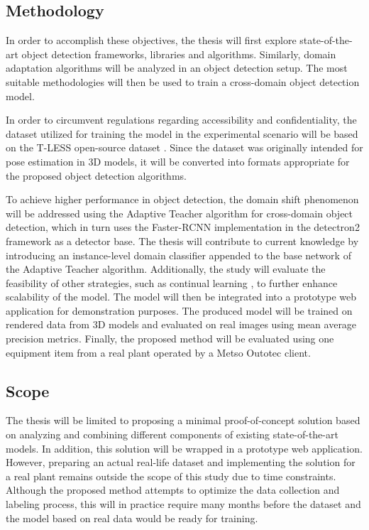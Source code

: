 \documentclass[english, 12pt, a4paper, elec, utf8, a-1b, online]{aaltothesis}
\begin{document}
\subsection{Methodology}
In order to accomplish these objectives, the thesis will first explore state-of-the-art object detection frameworks, libraries and algorithms. Similarly, domain adaptation algorithms will be analyzed in an object detection setup. The most suitable methodologies will then be used to train a cross-domain object detection model.  

In order to circumvent regulations regarding accessibility and confidentiality, the dataset utilized for training the model in the experimental scenario will be based on the T-LESS open-source dataset \cite{hodan2017tless}. Since the dataset was originally intended for pose estimation in 3D models, it will be converted into formats appropriate for the proposed object detection algorithms.

To achieve higher performance in object detection, the domain shift phenomenon will be addressed using the Adaptive Teacher \cite{Li2021}  algorithm for cross-domain object detection, which in turn uses the Faster-RCNN \cite{ima}  implementation in the detectron2 \cite{wu2019detectron2}  framework as a detector base.  The thesis will contribute to current knowledge by introducing an instance-level domain classifier appended to the base network of the Adaptive Teacher algorithm. Additionally, the study will evaluate the feasibility of other strategies, such as continual learning \cite{Parisi2018}, to further enhance scalability of the model. The model will then be integrated into a prototype web application for demonstration purposes. The produced model will be trained on rendered data from 3D models and evaluated on real images using mean average precision metrics. Finally, the proposed method will be evaluated using one equipment item from a real plant operated by a Metso Outotec client.

\clearpage

\subsection{Scope}

The thesis will be limited to proposing a minimal proof-of-concept solution based on analyzing and combining different components of existing state-of-the-art models. In addition, this solution will be wrapped in a prototype web application. However, preparing an actual real-life dataset and implementing the solution for a real plant remains outside the scope of this study due to time constraints. Although the proposed method attempts to optimize the data collection and labeling process, this will in practice require many months before the dataset and the model based on real data would be ready for training. 
\end{document}
